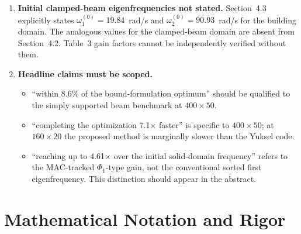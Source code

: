 \documentclass[11pt,a4paper]{article}
\begin{document}
\begin{enumerate}[leftmargin=*, label=\textbf{V\arabic*.}]
\item \textbf{Initial clamped-beam eigenfrequencies not stated.}
Section~4.3 explicitly states $\omega_1^{(0)}=19.84$~rad/s and
$\omega_2^{(0)}=90.93$~rad/s for the building domain. The analogous
values for the clamped-beam domain are absent from Section~4.2.
Table~3 gain factors cannot be independently verified without them.

\item \textbf{Headline claims must be scoped.}
\begin{itemize}
  \item ``within 8.6\% of the bound-formulation optimum'' should be
    qualified to the simply supported beam benchmark at $400\times50$.
  \item ``completing the optimization 7.1$\times$ faster'' is specific to
    $400\times50$; at $160\times20$ the proposed method is marginally
    slower than the Yuksel code.
  \item ``reaching up to 4.61$\times$ over the initial solid-domain
    frequency'' refers to the MAC-tracked $\Phi_1$-type gain, not the
    conventional sorted first eigenfrequency. This distinction should
    appear in the abstract.
\end{itemize}

\end{enumerate}

\section{Mathematical Notation and Rigor}
\end{document}
